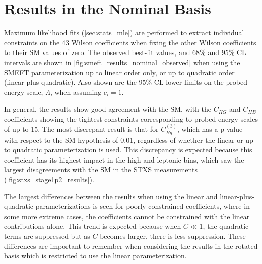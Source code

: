 \section{Results in the Nominal Basis}\label{sec:eft_nominal_basis_results}
Maximum likelihood fits (\cref{sec:stats_mle}) are performed to extract individual constraints on the 43 Wilson coefficients when fixing the other Wilson coefficients to their SM values of zero. The observed best-fit values, and 68\% and 95\% CL intervals are shown in \cref{fig:smeft_results_nominal_observed} when using the SMEFT parameterization up to linear order only, or up to quadratic order (linear-plus-quadratic). Also shown are the 95\% CL lower limits on the probed energy scale, $\Lambda$, when assuming $c_i=1$. 

In general, the results show good agreement with the SM, with the $C_{HG}$ and $C_{HB}$ coefficients showing the tightest constraints corresponding to probed energy scales of up to 15\TeV. The most discrepant result is that for $C_{Hq}^{(3)}$, which has a p-value with respect to the SM hypothesis of 0.01, regardless of whether the linear or up to quadratic parameterization is used. This discrepancy is expected because this coefficient has its highest impact in the high \ptV \WH and \ZH leptonic bins, which saw the largest disagreements with the SM in the STXS measurements (\cref{fig:stxs_stage1p2_results}).

The largest differences between the results when using the linear and linear-plus-quadratic parameterizations is seen for poorly constrained coefficients, where in some more extreme cases, the coefficients cannot be constrained with the linear contributions alone. This trend is expected because when $C \ll 1$, the quadratic terms are suppressed but as $C$ becomes larger, there is less suppression. These differences are important to remember when considering the results in the rotated basis which is restricted to use the linear parameterization.

